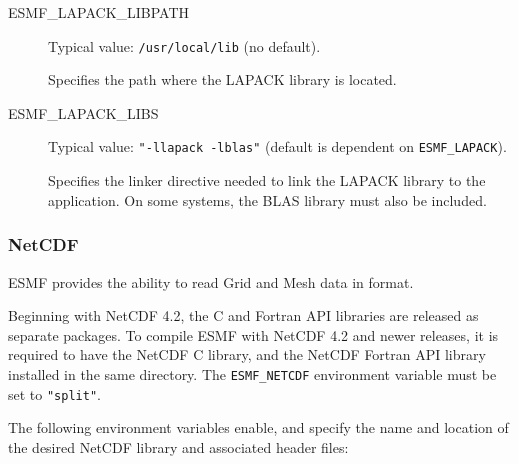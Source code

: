 \begin{description}
\item[ESMF\_LAPACK\_LIBPATH] Typical value: {\tt /usr/local/lib} (no default).

Specifies the path where the LAPACK library is located.

\item[ESMF\_LAPACK\_LIBS] Typical value: {\tt "-llapack -lblas"} 
(default is dependent on {\tt ESMF\_LAPACK}).

Specifies the linker directive needed to link the LAPACK library to
the application.  On some systems, the BLAS library must also be included.
\end{description}


\subsubsection{NetCDF}
\label{sec:netcdf}
ESMF provides the ability to read Grid and Mesh data in 
 format. 

Beginning with NetCDF 4.2, the C and Fortran API libraries are released as separate packages.
To compile ESMF with NetCDF 4.2 and newer releases, it is required to have the NetCDF C library, 
and the NetCDF Fortran API library installed in the same directory. 
The {\tt ESMF\_NETCDF} environment variable must be set to {\tt "split"}.

The following environment variables enable, and specify the name and location
of the desired NetCDF library and associated header files:


